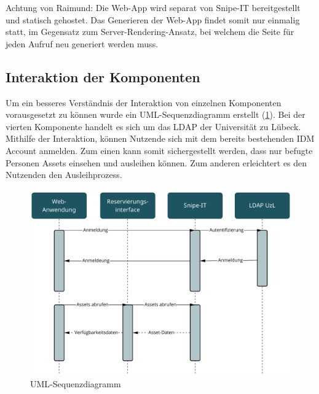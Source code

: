 Achtung von Raimund: Die Web-App wird separat von Snipe-IT bereitgestellt und
statisch gehostet. Das Generieren der Web-App findet somit nur einmalig statt,
im Gegensatz zum Server-Rendering-Ansatz, bei welchem die Seite für jeden Aufruf
neu generiert werden muss.

\subsection{Interaktion der Komponenten}
Um ein besseres Verständnis der Interaktion von einzelnen Komponenten
vorausgesetzt zu können wurde ein UML-Sequenzdiagramm erstellt (\ref{fig:uml}).
Bei der vierten Komponente handelt es sich um das LDAP der Universität zu
Lübeck. Mithilfe der Interaktion, können Nutzende sich mit dem bereits
bestehenden IDM Account anmelden. Zum einen kann somit sichergestellt werden,
dass nur befugte Personen Assets einsehen und ausleihen können. Zum anderen
erleichtert es den Nutzenden den Ausleihprozess.

\begin{figure}[h]
    \centering
    \includegraphics[scale=0.45]{Bilder/uml.pdf}
    \caption[UML-Sequenzdiagramm]{UML-Sequenzdiagramm}
    \label{fig:uml}
\end{figure}


